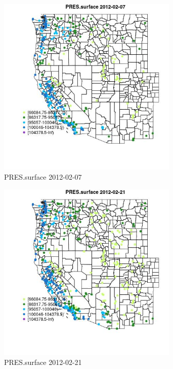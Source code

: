 \begin{figure} 
\centering  
\includegraphics[width=0.77\textwidth]{Code_Outputs/Report_ML_input_PM25_Step4_part_f_de_duplicated_aves_prioritize_24hr_obswNAs_MapObsPRESsurface2012-02-07.jpg} 
\caption{\label{fig:Report_ML_input_PM25_Step4_part_f_de_duplicated_aves_prioritize_24hr_obswNAsMapObsPRESsurface2012-02-07}PRES.surface 2012-02-07} 
\end{figure} 
 

\begin{figure} 
\centering  
\includegraphics[width=0.77\textwidth]{Code_Outputs/Report_ML_input_PM25_Step4_part_f_de_duplicated_aves_prioritize_24hr_obswNAs_MapObsPRESsurface2012-02-21.jpg} 
\caption{\label{fig:Report_ML_input_PM25_Step4_part_f_de_duplicated_aves_prioritize_24hr_obswNAsMapObsPRESsurface2012-02-21}PRES.surface 2012-02-21} 
\end{figure} 
 

